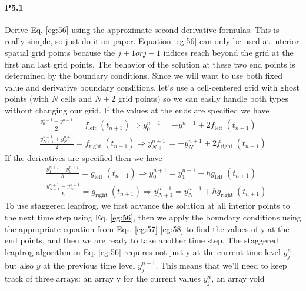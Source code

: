 \documentclass{book}
\theoremstyle{plain}
\theoremstyle{definition}
\numberwithin{exm}{chapter}
\theoremstyle{remark}
\theoremstyle{summary}
\theoremstyle{overview}
\begin{document}
\paragraph*{P5.1} Derive Eq. \eqref{eg:56} using the approximate second derivative formulas. This is
really simple, so just do it on paper.
Equation \eqref{eg:56} can only be used at interior spatial grid points because the
$ j + 1 {or} j-1$  indices reach beyond the grid at the first and last grid points. The
behavior of the solution at these two end points is determined by the boundary
conditions. Since we will want to use both fixed value and derivative boundary
conditions, let\rq s use a cell-centered grid with ghost points (with $N$ cells and $N+2$ grid points) so we can easily handle both types without changing our grid. If the values at the ends are specified we have 
\begin{equation}\label{eq:57}
\begin{gathered}
\frac{y_{0}^{n+1}+y_{1}^{n+1}}{2}=f_{\text {left }}\left(t_{n+1}\right) \Rightarrow y_{0}^{n+1}=-y_{1}^{n+1}+2 f_{\text {left }}\left(t_{n+1}\right) \\
\frac{y_{N+1}^{n+1}+y_{N}^{n+1}}{2}=f_{\text {right }}\left(t_{n+1}\right) \Rightarrow y_{N+1}^{n+1}=-y_{N}^{n+1}+2 f_{\text {right }}\left(t_{n+1}\right)
\end{gathered}
\end{equation}
If the derivatives are specified then we have
\begin{equation}\label{eq:58}
\begin{aligned}
&\frac{y_{1}^{n+1}-y_{0}^{n+1}}{h}=g_{\text {left }}\left(t_{n+1}\right) \Rightarrow y_{0}^{n+1}=y_{1}^{n+1}-h g_{\text {left }}\left(t_{n+1}\right) \\
&\frac{y_{N+1}^{n+1}-y_{N}^{n+1}}{h}=g_{\text {right }}\left(t_{n+1}\right) \Rightarrow y_{N+1}^{n+1}=y_{N}^{n+1}+h g_{\text {right }}\left(t_{n+1}\right)
\end{aligned}
\end{equation}
To use staggered leapfrog, we first advance the solution at all interior points to
the next time step using Eq. \eqref{eg:56}, then we apply the boundary conditions using
the appropriate equation from Eqs. \eqref{eg:57}-\eqref{eg:58} to find the values of y at the end
points, and then we are ready to take another time step.
The staggered leapfrog algorithm in Eq. \eqref{eg:56} requires not just y at the current
time level $ y_j^n$ but also $y$ at the previous time level $y^{n−1}_j$. This means that we\rq ll need
to keep track of three arrays: an array y for the current values $ y_j^n$, an array yold
\end{document}

